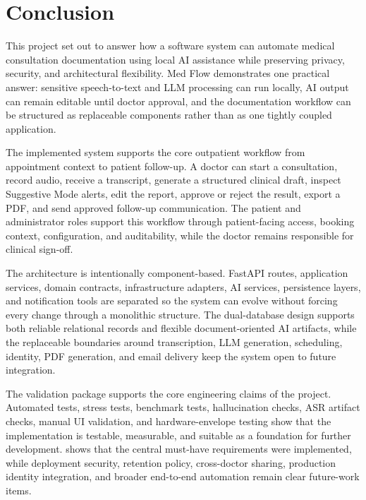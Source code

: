 \section{Conclusion}
\label{sec:conclusion}

This project set out to answer how a software system can automate medical consultation documentation using local AI assistance while preserving privacy, security, and architectural flexibility. Med Flow demonstrates one practical answer: sensitive speech-to-text and LLM processing can run locally, AI output can remain editable until doctor approval, and the documentation workflow can be structured as replaceable components rather than as one tightly coupled application.

The implemented system supports the core outpatient workflow from appointment context to patient follow-up. A doctor can start a consultation, record audio, receive a transcript, generate a structured clinical draft, inspect Suggestive Mode alerts, edit the report, approve or reject the result, export a PDF, and send approved follow-up communication. The patient and administrator roles support this workflow through patient-facing access, booking context, configuration, and auditability, while the doctor remains responsible for clinical sign-off.

The architecture is intentionally component-based. FastAPI routes, application services, domain contracts, infrastructure adapters, AI services, persistence layers, and notification tools are separated so the system can evolve without forcing every change through a monolithic structure. The dual-database design supports both reliable relational records and flexible document-oriented AI artifacts, while the replaceable boundaries around transcription, LLM generation, scheduling, identity, PDF generation, and email delivery keep the system open to future integration.

The validation package supports the core engineering claims of the project. Automated tests, stress tests, benchmark tests, hallucination checks, ASR artifact checks, manual UI validation, and hardware-envelope testing show that the implementation is testable, measurable, and suitable as a foundation for further development.  shows that the central must-have requirements were implemented, while deployment security, retention policy, cross-doctor sharing, production identity integration, and broader end-to-end automation remain clear future-work items.

